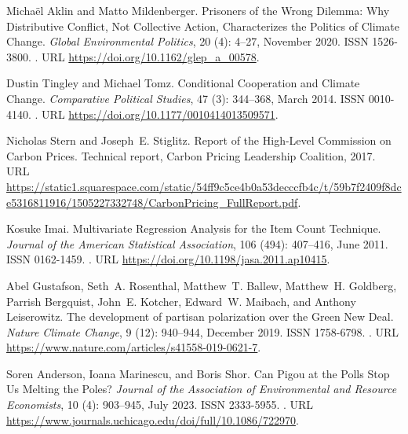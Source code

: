\begin{thebibliography}{55}
  Micha{\"e}l Aklin and Matto Mildenberger.
  \newblock Prisoners of the {{Wrong Dilemma}}: {{Why Distributive Conflict}},
    {{Not Collective Action}}, {{Characterizes}} the {{Politics}} of {{Climate
    Change}}.
  \newblock \emph{Global Environmental Politics}, 20 (4):
    4--27, November 2020.
  \newblock ISSN 1526-3800.
  \newblock {}.
  \newblock URL \url{https://doi.org/10.1162/glep\_a\_00578}.
  
  Dustin Tingley and Michael Tomz.
  \newblock Conditional {{Cooperation}} and {{Climate Change}}.
  \newblock \emph{Comparative Political Studies}, 47 (3):
    344--368, March 2014.
  \newblock ISSN 0010-4140.
  \newblock {}.
  \newblock URL \url{https://doi.org/10.1177/0010414013509571}.
  
  Nicholas Stern and Joseph~E. Stiglitz.
  \newblock Report of the {{High-Level Commission}} on {{Carbon Prices}}.
  \newblock Technical report, Carbon Pricing Leadership Coalition, 2017.
  \newblock URL
    \url{https://static1.squarespace.com/static/54ff9c5ce4b0a53decccfb4c/t/59b7f2409f8dce5316811916/1505227332748/CarbonPricing\_FullReport.pdf}.
  
  Kosuke Imai.
  \newblock Multivariate {{Regression Analysis}} for the {{Item Count
    Technique}}.
  \newblock \emph{Journal of the American Statistical Association}, 106
    (494): 407--416, June 2011.
  \newblock ISSN 0162-1459.
  \newblock {}.
  \newblock URL \url{https://doi.org/10.1198/jasa.2011.ap10415}.
  
  Abel Gustafson, Seth~A. Rosenthal, Matthew~T. Ballew, Matthew~H. Goldberg,
    Parrish Bergquist, John~E. Kotcher, Edward~W. Maibach, and Anthony
    Leiserowitz.
  \newblock The development of partisan polarization over the {{Green New Deal}}.
  \newblock \emph{Nature Climate Change}, 9 (12): 940--944,
    December 2019.
  \newblock ISSN 1758-6798.
  \newblock {}.
  \newblock URL \url{https://www.nature.com/articles/s41558-019-0621-7}.
  
  Soren Anderson, Ioana Marinescu, and Boris Shor.
  \newblock Can {{Pigou}} at the {{Polls Stop Us Melting}} the {{Poles}}?
  \newblock \emph{Journal of the Association of Environmental and Resource
    Economists}, 10 (4): 903--945, July 2023.
  \newblock ISSN 2333-5955.
  \newblock {}.
  \newblock URL \url{https://www.journals.uchicago.edu/doi/full/10.1086/722970}.
  

\end{thebibliography}
